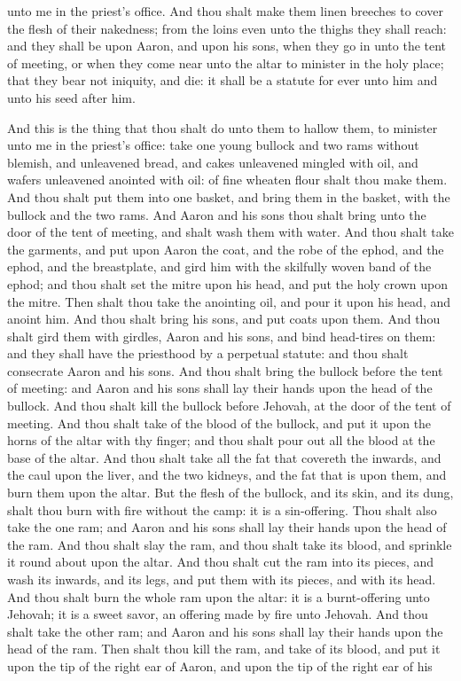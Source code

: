unto me in the priest’s office. And thou shalt make them linen breeches to cover the flesh of their nakedness; from the loins even unto the thighs they shall reach: and they shall be upon Aaron, and upon his sons, when they go in unto the tent of meeting, or when they come near unto the altar to minister in the holy place; that they bear not iniquity, and die: it shall be a statute for ever unto him and unto his seed after him. 

And this is the thing that thou shalt do unto them to hallow them, to minister unto me in the priest’s office: take one young bullock and two rams without blemish, and unleavened bread, and cakes unleavened mingled with oil, and wafers unleavened anointed with oil: of fine wheaten flour shalt thou make them. And thou shalt put them into one basket, and bring them in the basket, with the bullock and the two rams. And Aaron and his sons thou shalt bring unto the door of the tent of meeting, and shalt wash them with water. And thou shalt take the garments, and put upon Aaron the coat, and the robe of the ephod, and the ephod, and the breastplate, and gird him with the skilfully woven band of the ephod; and thou shalt set the mitre upon his head, and put the holy crown upon the mitre. Then shalt thou take the anointing oil, and pour it upon his head, and anoint him. And thou shalt bring his sons, and put coats upon them. And thou shalt gird them with girdles, Aaron and his sons, and bind head-tires on them: and they shall have the priesthood by a perpetual statute: and thou shalt consecrate Aaron and his sons.  And thou shalt bring the bullock before the tent of meeting: and Aaron and his sons shall lay their hands upon the head of the bullock. And thou shalt kill the bullock before Jehovah, at the door of the tent of meeting. And thou shalt take of the blood of the bullock, and put it upon the horns of the altar with thy finger; and thou shalt pour out all the blood at the base of the altar. And thou shalt take all the fat that covereth the inwards, and the caul upon the liver, and the two kidneys, and the fat that is upon them, and burn them upon the altar. But the flesh of the bullock, and its skin, and its dung, shalt thou burn with fire without the camp: it is a sin-offering.  Thou shalt also take the one ram; and Aaron and his sons shall lay their hands upon the head of the ram. And thou shalt slay the ram, and thou shalt take its blood, and sprinkle it round about upon the altar. And thou shalt cut the ram into its pieces, and wash its inwards, and its legs, and put them with its pieces, and with its head. And thou shalt burn the whole ram upon the altar: it is a burnt-offering unto Jehovah; it is a sweet savor, an offering made by fire unto Jehovah.  And thou shalt take the other ram; and Aaron and his sons shall lay their hands upon the head of the ram. Then shalt thou kill the ram, and take of its blood, and put it upon the tip of the right ear of Aaron, and upon the tip of the right ear of his 